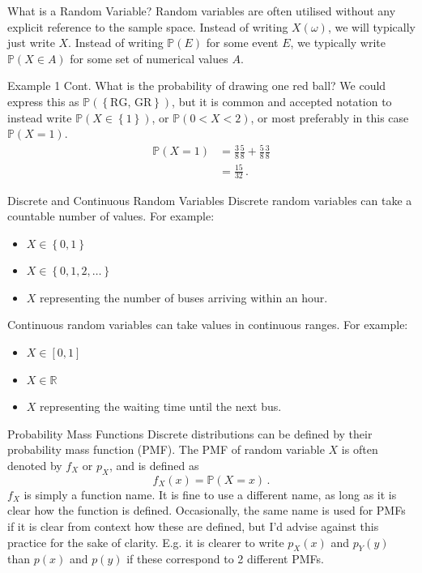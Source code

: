 \documentclass[10pt]{beamer}
\begin{document}
\begin{frame}[fragile]{What is a Random Variable?}
Random variables are often utilised without any explicit reference to the sample space. Instead of writing \(X\left(\omega\right)\), we will typically just write \(X\). Instead of writing \(\mathbb{P}\left(E\right)\) for some event \(E\), we typically write \(\mathbb{P}\left(X \in A\right)\) for some set of numerical values \(A\).
\begin{exampleblock}{Example 1 Cont.}
What is the probability of drawing one red ball? We could express this as \(\mathbb{P}\left(\left\{\text{RG, GR}\right\}\right)\), but it is common and accepted notation to instead write \(\mathbb{P}\left(X \in \left\{1\right\}\right)\), or \(\mathbb{P}\left(0 < X < 2\right)\), or most preferably in this case \(\mathbb{P}\left(X = 1\right)\).
\begin{align*}
    \mathbb{P}\left(X = 1\right) &= \frac{3}{8}\frac{5}{8} + \frac{5}{8}\frac{3}{8}\\
    &= \frac{15}{32}\,.
\end{align*}
\end{exampleblock}
\end{frame}

\begin{frame}[fragile]{Discrete and Continuous Random Variables}
Discrete random variables can take a countable number of values. For example:
\begin{itemize}
    \item \(X \in \left\{0, 1\right\}\)
    \item \(X \in \left\{0, 1, 2, \dots\right\}\)
    \item \(X\) representing the number of buses arriving within an hour.
\end{itemize}

Continuous random variables can take values in continuous ranges. For example:
\begin{itemize}
    \item \(X \in \left[0, 1\right]\)
    \item \(X \in \mathbb{R}\)
    \item \(X\) representing the waiting time until the next bus.
\end{itemize}
\end{frame}

\begin{frame}[fragile]{Probability Mass Functions}
Discrete distributions can be defined by their probability mass function (PMF). The PMF of random variable \(X\) is often denoted by \(f_X\) or \(p_X\), and is defined as
\begin{equation*}
    f_X\left(x\right) = \mathbb{P}\left(X = x\right)\,.
\end{equation*}
\(f_X\) is simply a function name. It is fine to use a different name, as long as it is clear how the function is defined. Occasionally, the same name is used for PMFs if it is clear from context how these are defined, but I'd advise against this practice for the sake of clarity. E.g. it is clearer to write \(p_X\left(x\right)\) and \(p_Y\left(y\right)\) than \(p\left(x\right)\) and \(p\left(y\right)\) if these correspond to 2 different PMFs.
\end{frame}
\end{document}
